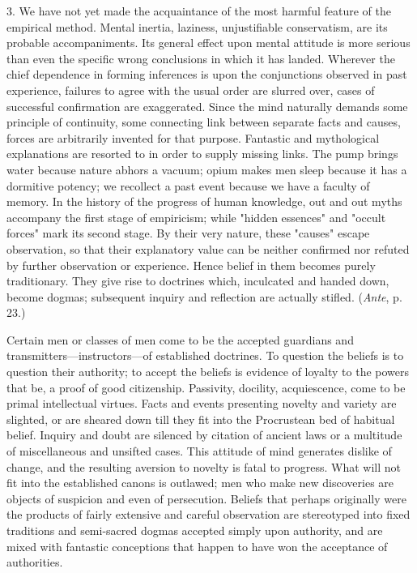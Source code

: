 \documentclass[letterpaper]{book}
\begin{document}

3. We have not yet made the acquaintance of the most harmful feature of
the empirical method. Mental inertia, laziness, unjustifiable
conservatism, are its probable accompaniments. Its general effect upon
mental attitude is more serious than even the specific wrong conclusions
in which it has landed. Wherever the chief dependence in forming
inferences is upon the conjunctions observed in past experience,
failures to agree with the usual order are slurred over, cases of
successful confirmation are exaggerated. Since the mind naturally
demands some principle of continuity, some connecting link between
separate facts and causes, forces are arbitrarily invented for that
purpose. Fantastic and mythological explanations are resorted to in
order to supply missing links. The pump brings water because nature
abhors a vacuum; opium makes men sleep because it has a
dormitive
potency; we recollect a past event because we have a faculty of memory.
In the history of the progress of human knowledge, out and out myths
accompany the first stage of empiricism; while "hidden essences" and
"occult forces" mark its second stage. By their very nature, these
"causes" escape observation, so that their explanatory value can be
neither confirmed nor refuted by further observation or experience.
Hence belief in them becomes purely traditionary. They give rise to
doctrines which, inculcated and handed down, become dogmas; subsequent
inquiry and reflection are actually stifled. (\emph{Ante}, p. 23.)


Certain men or classes of men come to be the accepted guardians and
transmitters---instructors---of established doctrines. To question the
beliefs is to question their authority; to accept the beliefs is
evidence of loyalty to the powers that be, a proof of good citizenship.
Passivity, docility, acquiescence, come to be primal intellectual
virtues. Facts and events presenting novelty and variety are slighted,
or are sheared down till they fit into the Procrustean bed of habitual
belief. Inquiry and doubt are silenced by citation of ancient laws or a
multitude of miscellaneous and unsifted cases. This attitude of mind
generates dislike of change, and the resulting aversion to novelty is
fatal to progress. What will not fit into the established canons is
outlawed; men who make new discoveries are objects of suspicion and even
of persecution. Beliefs that perhaps originally were the products of
fairly extensive and careful observation are stereotyped into fixed
traditions and semi-sacred dogmas accepted simply upon authority, and
are mixed with fantastic conceptions that happen to have won the
acceptance of
authorities.
\end{document}
